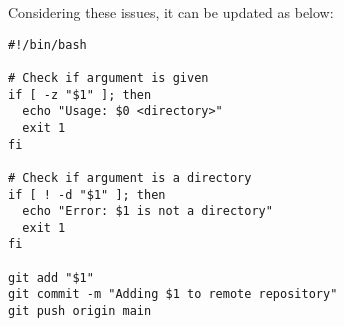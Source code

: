 \documentclass[10pt,letterpaper]{article}
\theoremstyle{definition}
\theoremstyle{definition}
\begin{document}
Considering these issues, it can be updated as below: 

\begin{lstlisting}[caption={Improved script to push a folder to a remote repository}, label={lst:gitpush}]
#!/bin/bash

# Check if argument is given
if [ -z "$1" ]; then
  echo "Usage: $0 <directory>"
  exit 1
fi

# Check if argument is a directory
if [ ! -d "$1" ]; then
  echo "Error: $1 is not a directory"
  exit 1
fi

git add "$1"
git commit -m "Adding $1 to remote repository"
git push origin main
\end{lstlisting}


\end{document}

